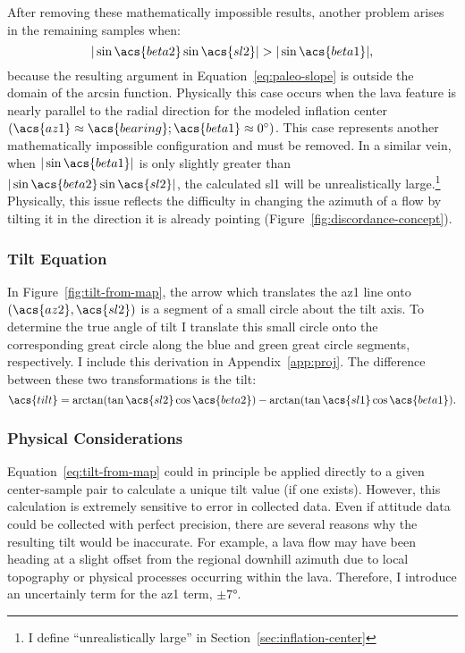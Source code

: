 After removing these mathematically impossible results, another problem arises in the remaining samples when:
\begin{equation}
     |\sin\acs{beta2}\sin\acs{sl2}| > |\sin\acs{beta1}|,\label{eq:domain-error}
\end{equation}
because the resulting argument in Equation~\eqref{eq:paleo-slope} is outside the domain of the arcsin function. Physically this case occurs when the lava feature is nearly parallel to the radial direction for the modeled inflation center $(\acs{az1}\approx\acs{bearing}; \acs{beta1}\approx\ang{0})$. This case represents another mathematically impossible configuration and must be removed. In a similar vein, when $|\sin\acs{beta1}|$ is only slightly greater than $|\sin\acs{beta2}\sin\acs{sl2}|$, the calculated \acs{sl1} will be unrealistically large.\footnote{I define ``unrealistically large'' in Section~\ref{sec:inflation-center}} Physically, this issue reflects the difficulty in changing the azimuth of a flow by tilting it in the direction it is already pointing (Figure~\ref{fig:discordance-concept}).

\subsubsection{Tilt Equation}

In Figure~\ref{fig:tilt-from-map}, the arrow which translates the \acs{az1} line onto $\left(\acs{az2},\acs{sl2}\right)$ is a segment of a small circle about the tilt axis. To determine the true angle of tilt I translate this small circle onto the corresponding great circle along the blue and green great circle segments, respectively. I include this derivation in Appendix~\ref{app:proj}. The difference between these two transformations is the tilt: 
\begin{equation}
    \acs{tilt} = \arctan(\tan\acs{sl2}\cos\acs{beta2}) - \arctan(\tan\acs{sl1}\cos\acs{beta1}).\label{eq:tilt-from-map}
\end{equation}

\subsubsection{Physical Considerations}

Equation~\eqref{eq:tilt-from-map} could in principle be applied directly to a given center-sample pair to calculate a unique tilt value (if one exists). However, this calculation is extremely sensitive to error in collected data. Even if attitude data could be collected with perfect precision, there are several reasons why the resulting tilt would be inaccurate. For example, a lava flow may have been heading at a slight offset from the regional downhill azimuth due to local topography or physical processes occurring within the lava. Therefore, I introduce an uncertainly term for the \acs{az1} term, $\pm\ang{7}$. 

